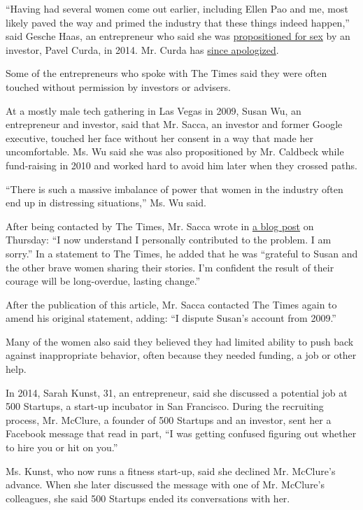 ``Having had several women come out earlier, including Ellen Pao and me,
most likely paved the way and primed the industry that these things
indeed happen,'' said Gesche Haas, an entrepreneur who said she was
\href{https://medium.com/dreamers-doers/the-journey-of-going-public-c50e69a6d648}{propositioned
for sex} by an investor, Pavel Curda, in 2014. Mr. Curda has
\href{http://www.businessinsider.com/angel-investor-pavel-curda-apologizes-for-sexual-messages-2014-8}{since
apologized}.

Some of the entrepreneurs who spoke with The Times said they were often
touched without permission by investors or advisers.

At a mostly male tech gathering in Las Vegas in 2009, Susan Wu, an
entrepreneur and investor, said that Mr. Sacca, an investor and former
Google executive, touched her face without her consent in a way that
made her uncomfortable. Ms. Wu said she was also propositioned by Mr.
Caldbeck while fund-raising in 2010 and worked hard to avoid him later
when they crossed paths.

``There is such a massive imbalance of power that women in the industry
often end up in distressing situations,'' Ms. Wu said.

After being contacted by The Times, Mr. Sacca wrote in
\href{https://medium.com/@sacca/i-have-more-work-to-do-c775c5d56ca1}{a
blog post} on Thursday: ``I now understand I personally contributed to
the problem. I am sorry.'' In a statement to The Times, he added that he
was ``grateful to Susan and the other brave women sharing their stories.
I'm confident the result of their courage will be long-overdue, lasting
change.''

After the publication of this article, Mr. Sacca contacted The Times
again to amend his original statement, adding: ``I dispute Susan's
account from 2009.''

Many of the women also said they believed they had limited ability to
push back against inappropriate behavior, often because they needed
funding, a job or other help.

In 2014, Sarah Kunst, 31, an entrepreneur, said she discussed a
potential job at 500 Startups, a start-up incubator in San Francisco.
During the recruiting process, Mr. McClure, a founder of 500 Startups
and an investor, sent her a Facebook message that read in part, ``I was
getting confused figuring out whether to hire you or hit on you.''

Ms. Kunst, who now runs a fitness start-up, said she declined Mr.
McClure's advance. When she later discussed the message with one of Mr.
McClure's colleagues, she said 500 Startups ended its conversations with
her.

